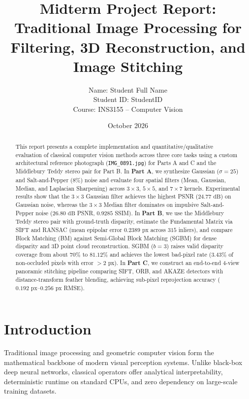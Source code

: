 \documentclass[a4paper,12pt]{article}
\begin{document}
\title{\textcolor{titleblue}{Midterm Project Report:\\Traditional Image Processing for Filtering, 3D Reconstruction, and Image Stitching}}

\author{\parbox{0.7\linewidth}{\centering
Name: Student Full Name\\
Student ID: StudentID\\
Course: INS3155 -- Computer Vision}}

\date{October 2026}

\maketitle

\begin{abstract}
This report presents a complete implementation and quantitative/qualitative evaluation of classical computer vision methods across three core tasks using a custom architectural reference photograph (\texttt{IMG\_0891.jpg}) for Parts A and C and the Middlebury Teddy stereo pair for Part B. In \textbf{Part A}, we synthesize Gaussian ($\sigma=25$) and Salt-and-Pepper ($8\%$) noise and evaluate four spatial filters (Mean, Gaussian, Median, and Laplacian Sharpening) across $3\times 3$, $5\times 5$, and $7\times 7$ kernels. Experimental results show that the $3\times 3$ Gaussian filter achieves the highest PSNR ($24.77\text{ dB}$) on Gaussian noise, whereas the $3\times 3$ Median filter dominates on impulsive Salt-and-Pepper noise ($26.80\text{ dB}$ PSNR, $0.9285$ SSIM). In \textbf{Part B}, we use the Middlebury Teddy stereo pair with ground-truth disparity, estimate the Fundamental Matrix via SIFT and RANSAC (mean epipolar error $0.2389\text{ px}$ across $315$ inliers), and compare Block Matching (BM) against Semi-Global Block Matching (SGBM) for dense disparity and 3D point cloud reconstruction. SGBM ($b=3$) raises valid disparity coverage from about $70\%$ to $81.12\%$ and achieves the lowest bad-pixel rate ($3.43\%$ of non-occluded pixels with error $>2$ px). In \textbf{Part C}, we construct an end-to-end 4-view panoramic stitching pipeline comparing SIFT, ORB, and AKAZE detectors with distance-transform feather blending, achieving sub-pixel reprojection accuracy ($0.192\text{ px}$--$0.256\text{ px}$ RMSE).
\end{abstract}

\section{Introduction}
Traditional image processing and geometric computer vision form the mathematical backbone of modern visual perception systems. Unlike black-box deep neural networks, classical operators offer analytical interpretability, deterministic runtime on standard CPUs, and zero dependency on large-scale training datasets.
\end{document}
